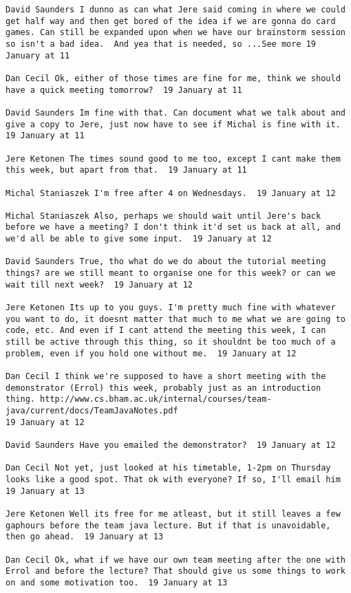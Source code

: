 \begin{verbatim}
David Saunders I dunno as can what Jere said coming in where we could
get half way and then get bored of the idea if we are gonna do card
games. Can still be expanded upon when we have our brainstorm session
so isn't a bad idea.  And yea that is needed, so ...See more 19
January at 11

Dan Cecil Ok, either of those times are fine for me, think we should
have a quick meeting tomorrow?  19 January at 11

David Saunders Im fine with that. Can document what we talk about and
give a copy to Jere, just now have to see if Michal is fine with it.
19 January at 11

Jere Ketonen The times sound good to me too, except I cant make them
this week, but apart from that.  19 January at 11

Michal Staniaszek I'm free after 4 on Wednesdays.  19 January at 12

Michal Staniaszek Also, perhaps we should wait until Jere's back
before we have a meeting? I don't think it'd set us back at all, and
we'd all be able to give some input.  19 January at 12

David Saunders True, tho what do we do about the tutorial meeting
things? are we still meant to organise one for this week? or can we
wait till next week?  19 January at 12

Jere Ketonen Its up to you guys. I'm pretty much fine with whatever
you want to do, it doesnt matter that much to me what we are going to
code, etc. And even if I cant attend the meeting this week, I can
still be active through this thing, so it shouldnt be too much of a
problem, even if you hold one without me.  19 January at 12

Dan Cecil I think we're supposed to have a short meeting with the
demonstrator (Errol) this week, probably just as an introduction
thing. http://www.cs.bham.ac.uk/internal/courses/team-java/current/docs/TeamJavaNotes.pdf
19 January at 12

David Saunders Have you emailed the demonstrator?  19 January at 12

Dan Cecil Not yet, just looked at his timetable, 1-2pm on Thursday
looks like a good spot. That ok with everyone? If so, I'll email him
19 January at 13

Jere Ketonen Well its free for me atleast, but it still leaves a few
gaphours before the team java lecture. But if that is unavoidable,
then go ahead.  19 January at 13

Dan Cecil Ok, what if we have our own team meeting after the one with
Errol and before the lecture? That should give us some things to work
on and some motivation too.  19 January at 13


\end{verbatim}
